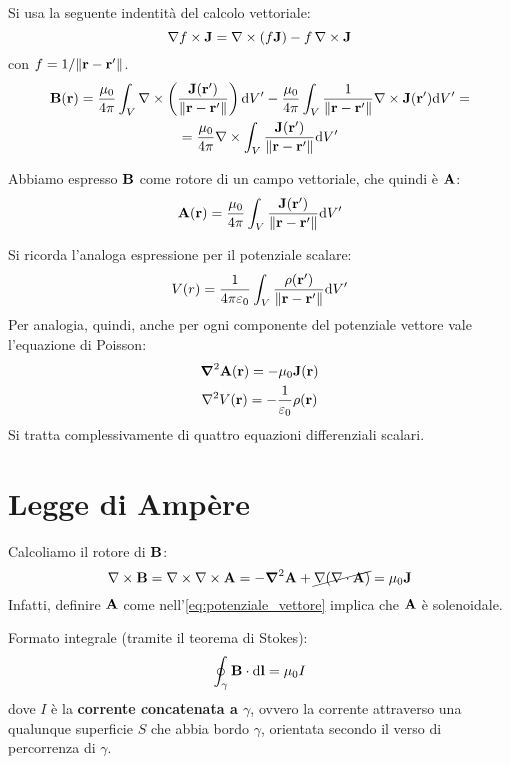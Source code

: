Si usa la seguente indentità del calcolo vettoriale:
\begin{equation}
    \nabla f \times \mathbf{J} = \nabla \times (f \mathbf{J})  - f \, \nabla \times \mathbf{J}
\end{equation}
con $f = 1/{\left\lVert \mathbf{r} - \mathbf{r}' \right\rVert}$.
\begin{gather}
    \mathbf{B}(\mathbf{r}) =
    \frac{\mu_0}{4\pi} \int_V \nabla \times \left( \frac{\mathbf{J}(\mathbf{r}')}{\left\lVert \mathbf{r} - \mathbf{r}' \right\rVert} \right) \mathrm{d} V' -
    \frac{\mu_0}{4\pi} \int_V \frac{1}{\left\lVert \mathbf{r} - \mathbf{r}' \right\rVert} \nabla \times \mathbf{J}(\mathbf{r}') \mathrm{d} V' = \\
    = \frac{\mu_0}{4\pi} \nabla \times \int_V \frac{\mathbf{J}(\mathbf{r}')}{\left\lVert \mathbf{r} - \mathbf{r}' \right\rVert} \mathrm{d} V'
\end{gather}

Abbiamo espresso $\mathbf{B}$ come rotore di un campo vettoriale, che quindi è $\mathbf{A}$:
\begin{equation}
\label{eq:potenziale_vettore}
    \mathbf{A}(\mathbf{r}) = \frac{\mu_0}{4\pi} \int_V \frac{\mathbf{J}(\mathbf{r}')}{\left\lVert \mathbf{r} - \mathbf{r}' \right\rVert} \mathrm{d} V'
\end{equation}

Si ricorda l'analoga espressione per il potenziale scalare:
\begin{equation}
    V(r) = \frac{1}{4\pi \varepsilon_0} \int_V \frac{\rho(\mathbf{r}')}{\left\lVert \mathbf{r} - \mathbf{r}' \right\rVert} \mathrm{d} V'
\end{equation}
Per analogia, quindi, anche per ogni componente del potenziale vettore vale l'equazione di Poisson:
\begin{gather}
    \boldsymbol{\nabla}^2 \mathbf{A}(\mathbf{r}) = - \mu_0 \mathbf{J}(\mathbf{r}) \\
    \nabla^2 V(\mathbf{r}) = - \frac{1}{\varepsilon_0} \rho(\mathbf{r})
\end{gather}
Si tratta complessivamente di quattro equazioni differenziali scalari.

\section{Legge di Ampère}

Calcoliamo il rotore di $\mathbf{B}$:
\begin{equation}
    \nabla \times \mathbf{B} = \nabla \times \nabla \times \mathbf{A} = - \boldsymbol{\nabla}^2 \mathbf{A} + \cancel{\nabla (\nabla \cdot \mathbf{A})} = \mu_0 \mathbf{J}
\end{equation}
Infatti, definire $\mathbf{A}$ come nell'\cref{eq:potenziale_vettore} implica che $\mathbf{A}$ è solenoidale.

Formato integrale (tramite il teorema di Stokes):
\begin{equation}
\label{eq:legge_di_ampere}
    \oint_\gamma \mathbf{B} \cdot \mathrm{d} \mathbf{l} = \mu_0 I
\end{equation}
dove $I$ è la \textbf{corrente concatenata a $\gamma$}, ovvero la corrente attraverso una qualunque superficie $S$ che abbia bordo $\gamma$, orientata secondo il verso di percorrenza di $\gamma$.

